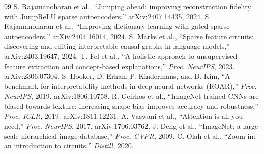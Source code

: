 \documentclass[conference]{IEEEtran}
\begin{document}
\begin{thebibliography}{99}
 S. Rajamanoharan et al., ``Jumping ahead: improving reconstruction fidelity with JumpReLU sparse autoencoders,'' arXiv:2407.14435, 2024.
 S. Rajamanoharan et al., ``Improving dictionary learning with gated sparse autoencoders,'' arXiv:2404.16014, 2024.
 S. Marks et al., ``Sparse feature circuits: discovering and editing interpretable causal graphs in language models,'' arXiv:2403.19647, 2024.
 T. Fel et al., ``A holistic approach to unsupervised feature extraction and concept-based explanations,'' \textit{Proc. NeurIPS}, 2023. arXiv:2306.07304.
 S. Hooker, D. Erhan, P. Kindermans, and B. Kim, ``A benchmark for interpretability methods in deep neural networks (ROAR),'' \textit{Proc. NeurIPS}, 2019. arXiv:1806.10758.
 R. Geirhos et al., ``ImageNet-trained CNNs are biased towards texture; increasing shape bias improves accuracy and robustness,'' \textit{Proc. ICLR}, 2019. arXiv:1811.12231.
 A. Vaswani et al., ``Attention is all you need,'' \textit{Proc. NeurIPS}, 2017. arXiv:1706.03762.
 J. Deng et al., ``ImageNet: a large-scale hierarchical image database,'' \textit{Proc. CVPR}, 2009.
 C. Olah et al., ``Zoom in: an introduction to circuits,'' \textit{Distill}, 2020.
\end{thebibliography}
\end{document}
